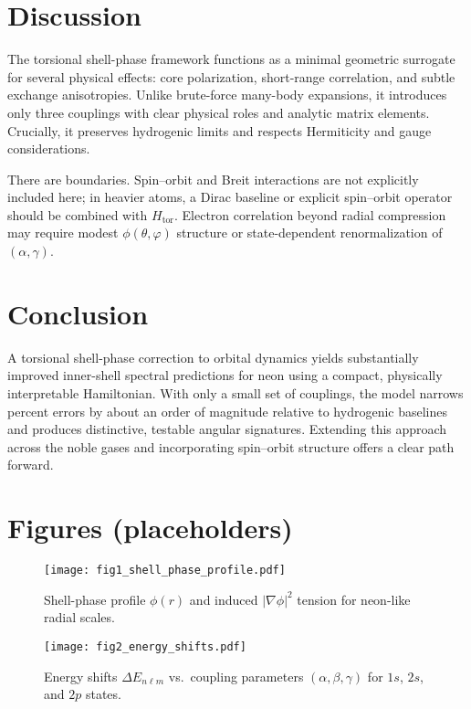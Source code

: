 \documentclass[12pt]{article}
\begin{document}
\section{Discussion}
The torsional shell-phase framework functions as a minimal geometric surrogate for several physical effects: core polarization, short-range correlation, and subtle exchange anisotropies. Unlike brute-force many-body expansions, it introduces only three couplings with clear physical roles and analytic matrix elements. Crucially, it preserves hydrogenic limits and respects Hermiticity and gauge considerations.

There are boundaries. Spin--orbit and Breit interactions are not explicitly included here; in heavier atoms, a Dirac baseline or explicit spin--orbit operator should be combined with $H_{\mathrm{tor}}$.\cite{Grant} Electron correlation beyond radial compression may require modest $\phi(\theta,\varphi)$ structure or state-dependent renormalization of $(\alpha,\gamma)$.

\section{Conclusion}
A torsional shell-phase correction to orbital dynamics yields substantially improved inner-shell spectral predictions for neon using a compact, physically interpretable Hamiltonian. With only a small set of couplings, the model narrows percent errors by about an order of magnitude relative to hydrogenic baselines and produces distinctive, testable angular signatures. Extending this approach across the noble gases and incorporating spin--orbit structure offers a clear path forward.

\section*{Figures (placeholders)}
\begin{figure}[h]
\centering
\texttt{[image: fig1\_shell\_phase\_profile.pdf]}
\caption{Shell-phase profile $\phi(r)$ and induced $|\nabla \phi|^2$ tension for neon-like radial scales.}
\end{figure}

\begin{figure}[h]
\centering
\texttt{[image: fig2\_energy\_shifts.pdf]}
\caption{Energy shifts $\Delta E_{n\ell m}$ vs.\ coupling parameters $(\alpha,\beta,\gamma)$ for $1s$, $2s$, and $2p$ states.}
\end{figure}
\end{document}
